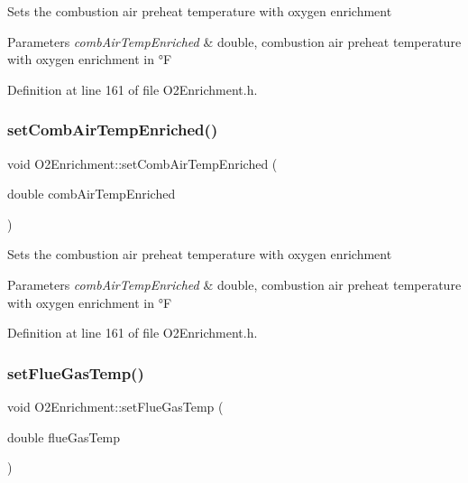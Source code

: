 Sets the combustion air preheat temperature with oxygen enrichment 
\begin{DoxyParams}{Parameters}
{\em comb\+Air\+Temp\+Enriched} & double, combustion air preheat temperature with oxygen enrichment in °F \\
\hline
\end{DoxyParams}


Definition at line 161 of file O2\+Enrichment.\+h.

\mbox{\label{class_o2_enrichment_af245c75ea525a0f5955686b360b54dbb}} 
\subsubsection{\texorpdfstring{set\+Comb\+Air\+Temp\+Enriched()}{setCombAirTempEnriched()}\hspace{0.1cm}{\footnotesize\ttfamily [3/3]}}
{\footnotesize\ttfamily void O2\+Enrichment\+::set\+Comb\+Air\+Temp\+Enriched (\begin{DoxyParamCaption}\item[{double}]{comb\+Air\+Temp\+Enriched }\end{DoxyParamCaption})\hspace{0.3cm}{\ttfamily [inline]}}

Sets the combustion air preheat temperature with oxygen enrichment 
\begin{DoxyParams}{Parameters}
{\em comb\+Air\+Temp\+Enriched} & double, combustion air preheat temperature with oxygen enrichment in °F \\
\hline
\end{DoxyParams}


Definition at line 161 of file O2\+Enrichment.\+h.

\mbox{\label{class_o2_enrichment_a37e625de13b171a6db256a108455aab9}} 
\subsubsection{\texorpdfstring{set\+Flue\+Gas\+Temp()}{setFlueGasTemp()}\hspace{0.1cm}{\footnotesize\ttfamily [1/3]}}
{\footnotesize\ttfamily void O2\+Enrichment\+::set\+Flue\+Gas\+Temp (\begin{DoxyParamCaption}\item[{double}]{flue\+Gas\+Temp }\end{DoxyParamCaption})\hspace{0.3cm}{\ttfamily [inline]}}

